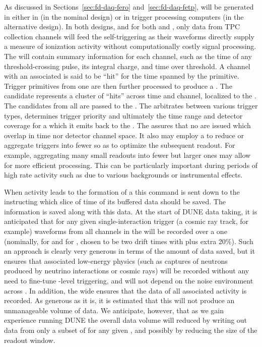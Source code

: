 As discussed in Sections~\ref{sec:fd-daq-fero}
and~\ref{sec:fd-daq-fetp},  will be generated in
either in  (in the nominal design) or in trigger
processing computers (in the alternative design). 
In both designs, and for both  and 
, only data from TPC collection channels will feed
the self-triggering as their waveforms directly supply a measure of
ionization activity without computationally costly signal processing.
The  will contain summary information for each
channel, such as the time of any threshold-crossing pulse, its
integral charge, and time over threshold. 
A channel with an associated  is said to be
``hit'' for the time spanned by the primitive. 
Trigger primitives from one  are then further processed
to produce a . 
The candidate represents a cluster of ``hits'' across time and
channel, localized to the .
The candidates from all  are passed to the
.
The  arbitrates between various trigger types, determines
trigger priority and ultimately the time range and detector coverage
for a  which it emits back to the .
The  assures that no  are issued which
overlap in time nor detector channel space.
It also may employ a  to reduce or aggregate triggers into
fewer  so as to optimize the subsequent readout. 
For example, aggregating many small readouts into fewer but larger
ones may allow for more efficient processing.   This can be particularly
important during periods of high rate activity such as due to various
backgrounds or instrumental effects.

When activity leads to the formation of a  this
command is sent down to the  instructing which slice of
time of its buffered data should be saved. 
The  information is saved along with this data. 
At the start of DUNE data taking, it is anticipated that for any given
single-interaction trigger (a cosmic ray track, for example) waveforms
from all channels in the  will be recorded over a one
 (nominally, \spreadout for  and
\dpreadout for , chosen to be two drift times with plus
extra 20\%). 
Such an approach is clearly very generous in terms of the amount of
data saved, but it ensures that associated low-energy physics (such as
captures of neutrons produced by neutrino interactions or cosmic rays)
will be recorded without any need to fine-tune -level
triggering, and will not depend on the noise environment across
. 
In addition, the wide  ensures that the data of
all associated activity is recorded.
As generous as it is, it is estimated that this 
will not produce an unmanageable volume of data. 
We anticipate, however, that as we gain experience running DUNE the
overall data volume will reduced by writing out data from only a
subset of  for any given , and possibly
by reducing the size of the readout window.

